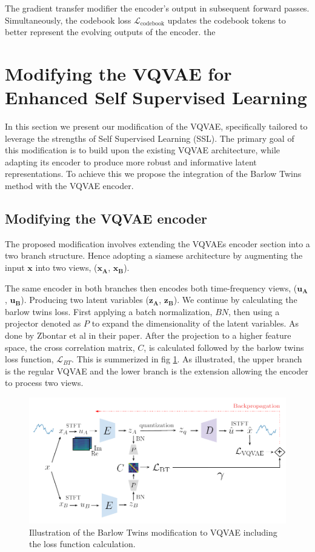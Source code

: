 The gradient transfer modifier the encoder's output in subsequent forward passes. Simultaneously, the codebook loss $\mathcal{L}_\text{codebook}$ updates the codebook tokens to better represent the evolving outputs of the encoder. 
the 
\section{Modifying the VQVAE for Enhanced Self Supervised Learning}
In this section we present our modification of the VQVAE, specifically tailored to leverage the strengths of Self Supervised Learning (SSL).
The primary goal of this modification is to build upon the existing VQVAE architecture, while adapting its encoder to produce more robust and informative latent representations.
To achieve this we propose the integration of the Barlow Twins method with the VQVAE encoder.


\subsection{Modifying the VQVAE encoder}
The proposed modification involves extending the VQVAEs encoder section into a two branch structure. Hence adopting a siamese architecture by augmenting 
the input $\mathbf{x}$ into two views, ($\mathbf{x_A}$, $\mathbf{x_B}$).

The same encoder in both branches then encodes both time-frequency views, ($\mathbf{u_A}$, $\mathbf{u_B}$). Producing two latent variables ($\mathbf{z_A}$, $\mathbf{z_B}$). We continue by calculating the barlow twins loss. First applying a batch normalization, $BN$, then using a projector denoted as $P$ to expand the dimensionality of the latent variables. As done by Zbontar et al in their paper\cite{Barlow}.
After the projection to a higher feature space, the cross correlation matrix, $C$, is calculated followed by the barlow twins loss function, $\mathcal{L}_{BT}$. This is summerized in fig \ref{fig:BTVQVAE}. 
As illustrated, the upper branch is the regular VQVAE and the lower branch is the extension allowing the encoder to process two views.

\begin{figure}[H]
    \includegraphics[scale=0.8]{figures/figure-pdf/BarlowTwinsVQVAE.pdf}
    \caption{Illustration of the Barlow Twins modification to VQVAE including the loss function calculation.}
    \label{fig:BTVQVAE}
\end{figure}

